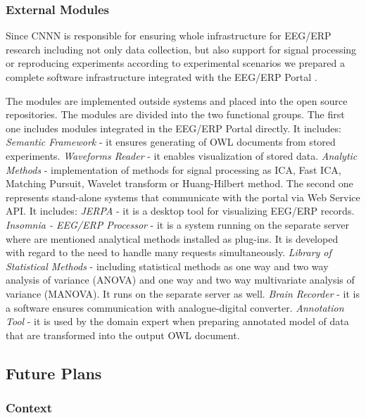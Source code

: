 \documentclass[a4paper, 10pt]{article}
\begin{document}
\subsubsection*{External Modules}

Since CNNN is responsible for ensuring  whole infrastructure for EEG/ERP research including not only data collection, but also support for signal processing or reproducing experiments according to experimental scenarios we prepared a complete software infrastructure integrated with the EEG/ERP Portal \cite{DBLP:conf/ic3k/MoucekJJP11, Overview-of-neuroinformatics-infrastructure-in-Pilsen}.

The modules are implemented outside systems and placed into the open source repositories. The modules are divided into the two functional groups. The first one includes modules integrated in the EEG/ERP Portal directly. It includes: \textit{Semantic Framework} - it ensures generating of OWL documents from stored experiments. \textit{Waveforms Reader} - it enables visualization of stored data. \textit{Analytic Methods} - implementation of methods for signal processing as ICA, Fast ICA, Matching Pursuit, Wavelet transform or Huang-Hilbert method. The second one represents stand-alone systems that communicate with the portal via Web Service API. It includes: \textit{JERPA} \cite{DBLP:conf/biostec/JezekM11} - it is a desktop tool for visualizing EEG/ERP records. \textit{Insomnia - EEG/ERP Processor} - it is a system running on the separate server where are mentioned analytical methods installed as plug-ins. It is developed with regard to the need to handle many requests simultaneously. \textit{Library of Statistical Methods} - including statistical methods as one way and two way analysis of variance (ANOVA) and one way and two way multivariate analysis of variance (MANOVA). It runs on the separate server as well. \textit{Brain Recorder} - it is a software ensures communication with analogue-digital converter. \textit{Annotation Tool} - it is used by the domain expert when preparing annotated model of data that are transformed into the output OWL document.



\subsection*{Future Plans}

\subsubsection*{Context}
\end{document}
